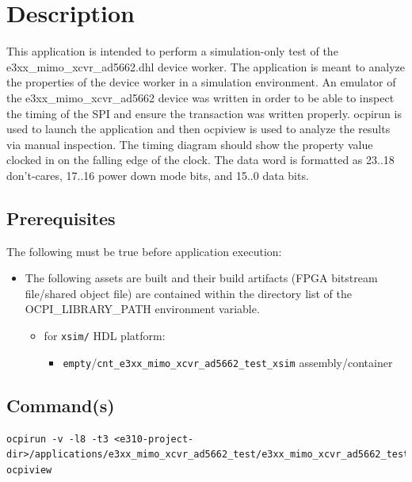 \section{Description}
This application is intended to perform a simulation-only test of the e3xx\_mimo\_xcvr\_ad5662.dhl device worker. The application is meant to analyze the properties of the device worker in a simulation environment. An emulator of the e3xx\_mimo\_xcvr\_ad5662 device was written in order to be able to inspect the timing of the SPI and ensure the transaction was written properly. ocpirun is used to launch the application and then ocpiview is used to analyze the results via manual inspection. The timing diagram should show the property value clocked in on the falling edge of the clock. The data word is formatted as 23..18 don't-cares, 17..16 power down mode bits, and 15..0 data bits.

\subsection{Prerequisites}
The following must be true before application execution:
\begin{itemize}
  \item The following assets are built and their build artifacts (FPGA bitstream file/shared object file) are contained within the directory list of the OCPI\_LIBRARY\_PATH environment variable.
  \begin{itemize}
    \item for \verb+xsim/+ HDL platform:
    \begin{itemize}
      \item \verb+empty+/\verb+cnt_e3xx_mimo_xcvr_ad5662_test_xsim+ assembly/container
    \end{itemize}
  \end{itemize}
\end{itemize}
\subsection{Command(s)}
\begin{lstlisting}
ocpirun -v -l8 -t3 <e310-project-dir>/applications/e3xx_mimo_xcvr_ad5662_test/e3xx_mimo_xcvr_ad5662_test.xml
ocpiview
\end{lstlisting}
